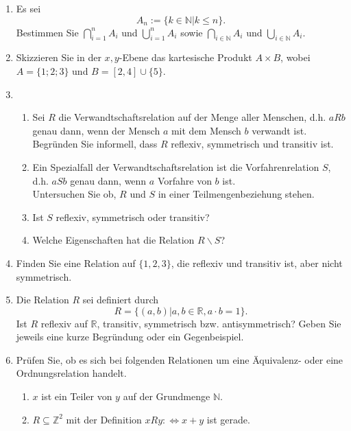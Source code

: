 \documentclass[12pt,a4paper]{scrreprt}
\newcommand{\N}{\mathds{N}}
\newcommand{\Z}{\mathds{Z}}
\newcommand{\R}{\mathds{R}}
\begin{document}
\begin{enumerate}
	\item Es sei	\[A_n := \{k \in \N | k \leq n\}.\]
		Bestimmen Sie $\bigcap\limits_{i=1}^n A_i$ und  $\bigcup\limits_{i=1}^n A_i$ sowie $\bigcap\limits_{i \in \N} A_i$ und  $\bigcup\limits_{i \in \N} A_i.$
\item Skizzieren Sie in der $x,y$-Ebene das kartesische Produkt $A \times B$, wobei \\ $A=\{1;2;3\}$ und $B=[2, 4] \cup \{5\}.$
\item 
\begin{enumerate}
\item
Sei $R$ die Verwandtschaftsrelation auf der Menge aller Menschen, d.h. $a R b$ genau dann, wenn der Mensch
$a$ mit dem Mensch $b$ verwandt ist. \\
Begründen Sie informell, dass $R$ reflexiv, symmetrisch und transitiv ist. 
\item
Ein Spezialfall der Verwandtschaftsrelation ist die Vorfahrenrelation $S$, d.h. $a S b$ genau dann, wenn
$a$ Vorfahre von $b$ ist. \\
Untersuchen Sie ob, $R$ und $S$ in einer Teilmengenbeziehung stehen.
\item Ist $S$ reflexiv, symmetrisch oder
transitiv? 
\item Welche Eigenschaften hat die Relation
$R \backslash S$?
\end{enumerate}
\item 
 Finden Sie eine Relation auf
					$\{1,2,3\}$, die reflexiv und transitiv ist,
					aber nicht symmetrisch.
\item Die Relation $R$ sei definiert durch
\[R=\{(a,b) | a, b \in \R, a\cdot b= 1 \}.\]
Ist $R$ reflexiv auf $\R$, transitiv, symmetrisch bzw. antisymmetrisch? Geben Sie jeweils eine kurze Begründung oder ein Gegenbeispiel.

\item Prüfen Sie, ob es sich bei folgenden Relationen um eine Äquivalenz- oder eine Ordnungsrelation handelt.

		\begin{enumerate}
			\item $x$ ist ein Teiler von $y$ auf der Grundmenge $\N$.
			\item $ R\subseteq \Z^2$ mit der Definition $x R y:\Leftrightarrow x+y$ ist gerade.
		\end{enumerate}
    \end{enumerate}
\end{document}
